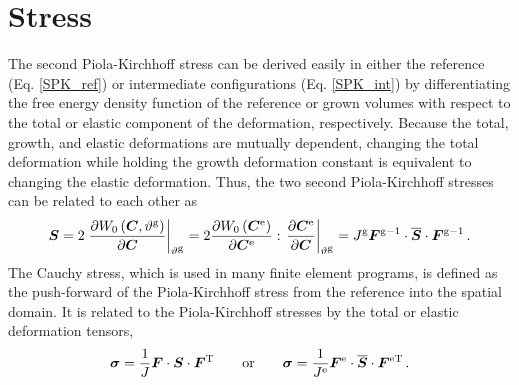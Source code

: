 \documentclass[10pt,letterpaper,oneside]{report}
\newcommand{\ten}[1]{\mbox{\boldmath $#1$}{}}
\newcommand{\scas}[1]{\mbox{{\scriptsize{${\rm{#1}}$}}}{}}
\begin{document}
\section{Stress}
The second Piola-Kirchhoff stress can be derived easily in either the reference (Eq. \ref{SPK_ref}) or intermediate configurations (Eq. \ref{SPK_int}) by differentiating the free energy density function of the reference or grown volumes with respect to the total or elastic component of the deformation, respectively.  Because the total, growth, and elastic deformations are mutually dependent, changing the total deformation while holding the growth deformation constant is equivalent to changing the elastic deformation.  Thus, the two second Piola-Kirchhoff stresses can be related to each other as
\begin{equation}
\ten{S} = 2 \left. \frac{\partial W_0 \left( \ten{C}, \vartheta^{\scas{g}} \right) }{\partial \ten{C}} \right|_{\vartheta^{\scas{g}}} = 2 \frac{\partial W_0 \left( \ten{C}^{\scas{e}}\right) }{\partial \ten{C}^{\scas{e}}} : \left. \frac{\partial \ten{C}^{\scas{e}}}{\partial \ten{C}} \right|_{\vartheta^{\scas{g}}} = J^{\scas{g}} \ten{F}^{\scas{g}-1} \cdot \overline{\ten{S}} \cdot \ten{F}^{\scas{g}-1} \, . 
\end{equation}
The Cauchy stress, which is used in many finite element programs, is defined as the push-forward of the Piola-Kirchhoff stress from the reference into the spatial domain.  It is related to the Piola-Kirchhoff stresses by the total or elastic deformation tensors, 
\begin{equation}
\ten{\sigma} = \frac{1}{J} \ten{F} \cdot \ten{S} \cdot \ten{F}^{\scas{T}}  
\qquad \mbox{or} \qquad   
\ten{\sigma} = \frac{1}{J^{\scas{e}}} \ten{F}^{\scas{e}} \cdot \overline{\ten{S}} \cdot \ten{F}^{\scas{eT}} \, .
\end{equation}
\end{document}
